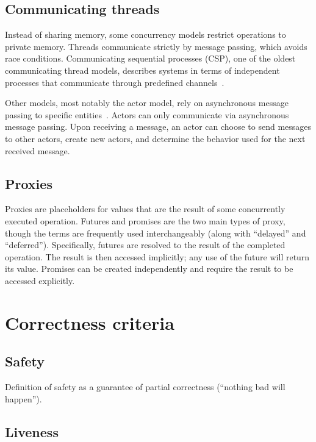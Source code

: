 \documentclass{sig-alternate}
\begin{document}
\subsection{Communicating threads}

Instead of sharing memory, some concurrency models restrict operations to private memory. Threads communicate strictly by message passing, which avoids race conditions. Communicating sequential processes (CSP), one of the oldest communicating thread models, describes systems in terms of independent processes that communicate through predefined channels~\cite{Hoare1978}.

Other models, most notably the actor model, rely on asynchronous message passing to specific entities~\cite{Agha1986}. Actors can only communicate via asynchronous message passing. Upon receiving a message, an actor can choose to send messages to other actors, create new actors, and determine the behavior used for the next received message.

\subsection{Proxies}

Proxies are placeholders for values that are the result of some concurrently executed operation. Futures and promises are the two main types of proxy, though the terms are frequently used interchangeably (along with ``delayed'' and ``deferred''). Specifically, futures are resolved to the result of the completed operation. The result is then accessed implicitly; any use of the future will return its value. Promises can be created independently and require the result to be accessed explicitly.

\section{Correctness criteria}

\subsection{Safety}

Definition of safety as a guarantee of partial correctness (``nothing bad will happen'').

\subsection{Liveness}
\end{document}
